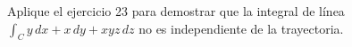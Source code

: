 \item Aplique el ejercicio 23 para demostrar que la integral de línea $\int_C y \, dx + x \, dy + xyz \, dz$ no es independiente de la trayectoria.

